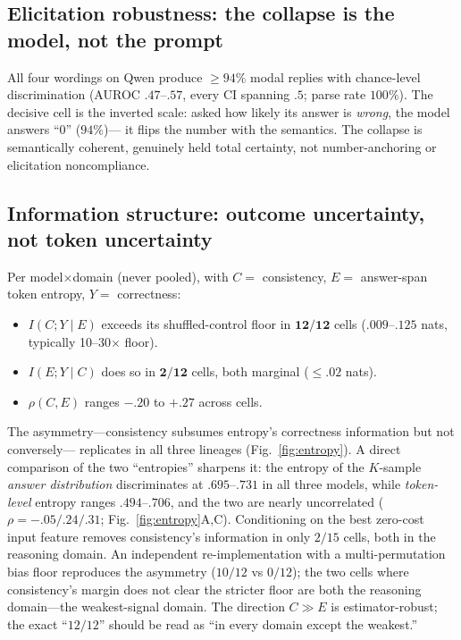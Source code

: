 \documentclass[10pt]{article}
\begin{document}
\subsection{Elicitation robustness: the collapse is the model, not the prompt}
All four wordings on Qwen produce $\ge 94\%$ modal replies with chance-level discrimination
(AUROC $.47$--$.57$, every CI spanning $.5$; parse rate $100\%$). The decisive cell is the
inverted scale: asked how likely its answer is \emph{wrong}, the model answers ``0'' ($94\%$)---
it flips the number with the semantics. The collapse is semantically coherent, genuinely held
total certainty, not number-anchoring or elicitation noncompliance.

\subsection{Information structure: outcome uncertainty, not token uncertainty}
Per model$\times$domain (never pooled), with $C=$ consistency, $E=$ answer-span token entropy,
$Y=$ correctness:
\begin{itemize}\itemsep1pt
\item $I(C;Y\mid E)$ exceeds its shuffled-control floor in $\mathbf{12/12}$ cells
($.009$--$.125$ nats, typically 10--30$\times$ floor).
\item $I(E;Y\mid C)$ does so in $\mathbf{2/12}$ cells, both marginal ($\le .02$ nats).
\item $\rho(C,E)$ ranges $-.20$ to $+.27$ across cells.
\end{itemize}
The asymmetry---consistency subsumes entropy's correctness information but not conversely---
replicates in all three lineages (Fig.~\ref{fig:entropy}). A direct comparison of the two
``entropies'' sharpens it: the entropy of the $K$-sample \emph{answer distribution} discriminates
at $.695$--$.731$ in all three models, while \emph{token-level} entropy ranges $.494$--$.706$,
and the two are nearly uncorrelated ($\rho = -.05 / .24 / .31$; Fig.~\ref{fig:entropy}A,C).
Conditioning on the best zero-cost input feature removes consistency's information in only
$2/15$ cells, both in the reasoning domain. An independent re-implementation with a
multi-permutation bias floor reproduces the asymmetry ($10/12$ vs $0/12$); the two cells where
consistency's margin does not clear the stricter floor are both the reasoning domain---the
weakest-signal domain. The direction $C \gg E$ is estimator-robust; the exact ``$12/12$''
should be read as ``in every domain except the weakest.''
\end{document}
